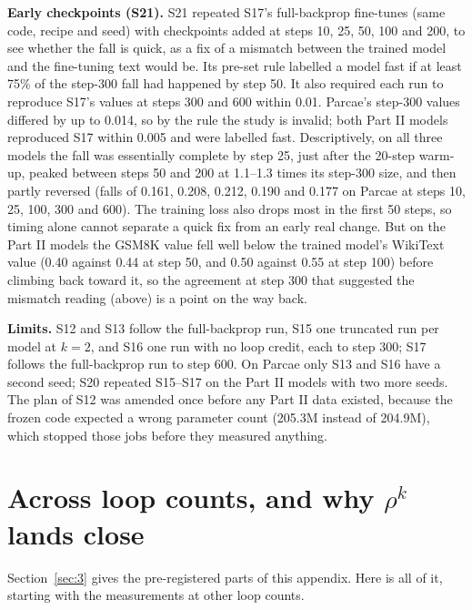 \documentclass[10pt]{article}
\begin{document}
\textbf{Early checkpoints (S21).} S21 repeated S17's full-backprop fine-tunes (same code, recipe and seed) with checkpoints added at steps 10, 25, 50, 100 and 200, to see whether the fall is quick, as a fix of a mismatch between the trained model and the fine-tuning text would be. Its pre-set rule labelled a model fast if at least 75\% of the step-300 fall had happened by step 50. It also required each run to reproduce S17's values at steps 300 and 600 within 0.01. Parcae's step-300 values differed by up to 0.014, so by the rule the study is invalid; both Part II models reproduced S17 within 0.005 and were labelled fast. Descriptively, on all three models the fall was essentially complete by step 25, just after the 20-step warm-up, peaked between steps 50 and 200 at 1.1--1.3 times its step-300 size, and then partly reversed (falls of 0.161, 0.208, 0.212, 0.190 and 0.177 on Parcae at steps 10, 25, 100, 300 and 600). The training loss also drops most in the first 50 steps, so timing alone cannot separate a quick fix from an early real change. But on the Part II models the GSM8K value fell well below the trained model's WikiText value (0.40 against 0.44 at step 50, and 0.50 against 0.55 at step 100) before climbing back toward it, so the agreement at step 300 that suggested the mismatch reading (above) is a point on the way back.

\textbf{Limits.} S12 and S13 follow the full-backprop run, S15 one truncated run per model at $k = 2$, and S16 one run with no loop credit, each to step 300; S17 follows the full-backprop run to step 600. On Parcae only S13 and S16 have a second seed; S20 repeated S15--S17 on the Part II models with two more seeds. The plan of S12 was amended once before any Part II data existed, because the frozen code expected a wrong parameter count (205.3M instead of 204.9M), which stopped those jobs before they measured anything.

\section{Across loop counts, and why $\rho^{k}$ lands close}\label{app:J}

Section~\ref{sec:3} gives the pre-registered parts of this appendix. Here is all of it, starting with the measurements at other loop counts.
\end{document}
